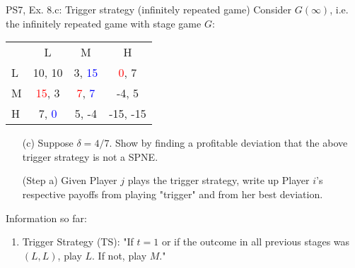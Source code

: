 \begin{frame}{PS7, Ex. 8.c: Trigger strategy (infinitely repeated game)}
    Consider $G(\infty)$, i.e. the infinitely repeated game with stage game $G$: \vspace{-6pt}
    \begin{table}
      \begin{tabular}{l|c|c|c|}
        \multicolumn{1}{c}{} & \multicolumn{1}{c}{L} & \multicolumn{1}{c}{M} & \multicolumn{1}{c}{H} \\\cline{2-4}
        L & 10, 10 & 3, \textcolor{blue}{15} & \textcolor{red}{0}, 7 \\\cline{2-4}
        M & \textcolor{red}{15}, 3 & \textcolor{red}{7}, \textcolor{blue}{7} & -4, 5 \\\cline{2-4}
        H & 7, \textcolor{blue}{0} & 5, -4 & -15, -15 \\\cline{2-4}
      \end{tabular}
    \end{table}
    \begin{itemize}
      \vspace{-4pt} \item[(c)] Suppose $\delta = 4/7$. Show by finding a profitable deviation that the above trigger strategy is not a SPNE. \vspace{-6pt}
    \end{itemize}
  \begin{multicols}{2}
    \begin{itemize}
      \item[(Step a)] Given Player $j$ plays the trigger strategy, write up Player $i$'s respective payoffs from playing "trigger" and from her best deviation.
    \end{itemize}
    \vfill\null\columnbreak
    Information so far:
    \begin{enumerate}
      \item Trigger Strategy (TS): "If $t=1$ or if the outcome in all previous stages was $(L,L)$, play $L$. If not, play $M$."
    \end{enumerate}
    \vfill\null
  \end{multicols}
\end{frame}
